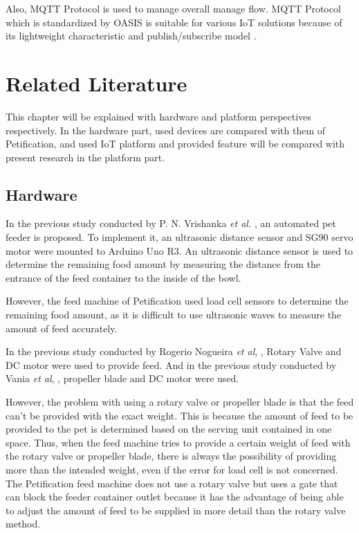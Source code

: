 \documentclass[conference]{IEEEtran}
\begin{document}
\indent Also, MQTT Protocol is used to manage overall manage flow. MQTT Protocol which is standardized by OASIS is suitable for various IoT solutions because of its lightweight characteristic and publish/subscribe model \cite{b9}.

\section{Related Literature}
This chapter will be explained with hardware and platform perspectives respectively. In the hardware part, used devices are compared with them of Petification, and used IoT platform and provided feature will be compared with present research in the platform part.

\subsection{Hardware}
In the previous study conducted by P. N. Vrishanka \textit{et al.} \cite{b11}, an automated pet feeder is proposed. To implement it, an ultrasonic distance sensor and SG90 servo motor were mounted to Arduino Uno R3. An ultrasonic distance sensor is used to determine the remaining food amount by measuring the distance from the entrance of the feed container to the inside of the bowl.

However, the feed machine of Petification used load cell sensors to determine the remaining food amount, as it is difficult to use ultrasonic waves to measure the amount of feed accurately.

In the previous study conducted by Rogerio Nogueira \textit{et al}, \cite{b12} , Rotary Valve and DC motor were used to provide feed. And in the previous study conducted by Vania \textit{et al}, \cite{b13}, propeller blade and DC motor were used.

However, the problem with using a rotary valve or propeller blade is that the feed can’t be provided with the exact weight. This is because the amount of feed to be provided to the pet is determined based on the serving unit contained in one space. Thus, when the feed machine tries to provide a certain weight of feed with the rotary valve or propeller blade, there is always the possibility of providing more than the intended weight, even if the error for load cell is not concerned. The Petification feed machine does not use a rotary valve but uses a gate that can block the feeder container outlet because it has the advantage of being able to adjust the amount of feed to be supplied in more detail than the rotary valve method.
\end{document}
